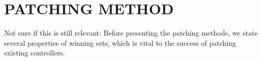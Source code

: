 
\section{PATCHING METHOD}
\label{sec:method}

{\color{red} Not sure if this is still relevant: } %
 Before presenting the patching methods, we state several properties of winning sets, which is vital to the success of patching existing controllers.

